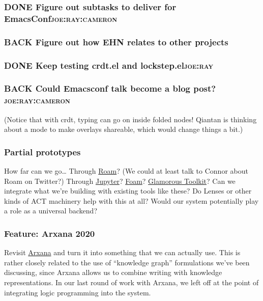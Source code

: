 \documentclass[11pt]{article}
\begin{document}
\subsubsection{{\bfseries\sffamily DONE} Figure out subtasks to deliver for EmacsConf\hfill{}\textsc{joe:ray:cameron}}
\label{sec:org9b48467}
\subsubsection{{\bfseries\sffamily BACK} Figure out how EHN relates to other projects}
\label{sec:org132c19d}
\subsubsection{{\bfseries\sffamily DONE} Keep testing crdt.el and lockstep.el\hfill{}\textsc{joe:ray}}
\label{sec:org5207371}
\subsubsection{{\bfseries\sffamily BACK} Could Emacsconf talk become a blog post?\hfill{}\textsc{joe:ray:cameron}}
\label{sec:orgebc28da}

(Notice that with crdt, typing can go on inside folded nodes! Qiantan
is thinking about a mode to make overlays shareable, which would
change things a bit.)

\subsubsection{Partial prototypes}
\label{sec:orgcfe9eec}

How far can we go\ldots{} Through \href{https://roamresearch.com/}{Roam}? (We could at least talk to Connor
about Roam on Twitter?) Through \href{https://jupyter.org/}{Jupyter}? \href{https://foambubble.github.io/foam/}{Foam}? \href{https://gtoolkit.com/}{Glamorous Toolkit}?  Can
we integrate what we’re building with existing tools like these?  Do
Lenses or other kinds of ACT machinery help with this at all?  Would
our system potentially play a role as a universal backend?

\subsubsection{Feature: Arxana 2020}
\label{sec:orgc729a59}

Revisit \href{https://repo.or.cz/w/arxana.git}{Arxana} and turn it into something that we can actually use.
This is rather closely related to the use of “knowledge graph”
formulations we’ve been discussing, since Arxana allows us to combine
writing with knowledge representations.  In our last round of work
with Arxana, we left off at the point of integrating logic programming
into the system.
\end{document}
